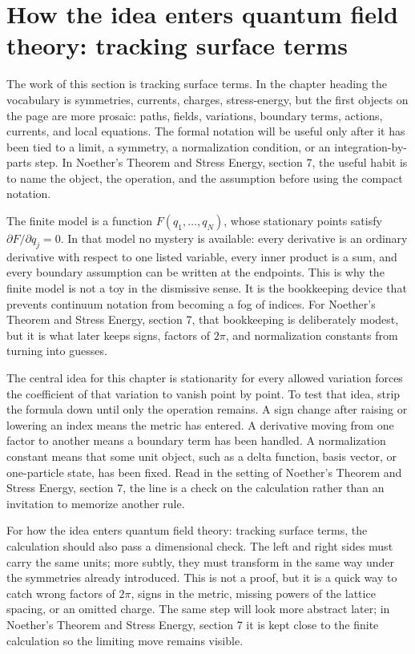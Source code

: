 \section{How the idea enters quantum field theory: tracking surface terms}

The work of this section is tracking surface terms.  In the chapter heading the vocabulary is symmetries, currents, charges, stress-energy, but the first objects on the page are more prosaic: paths, fields, variations, boundary terms, actions, currents, and local equations.  The formal notation will be useful only after it has been tied to a limit, a symmetry, a normalization condition, or an integration-by-parts step.  In Noether's Theorem and Stress Energy, section 7, the useful habit is to name the object, the operation, and the assumption before using the compact notation.

The finite model is a function \(F(q_1,\ldots,q_N)\), whose stationary points satisfy \( \partial F/\partial q_j=0 \).  In that model no mystery is available: every derivative is an ordinary derivative with respect to one listed variable, every inner product is a sum, and every boundary assumption can be written at the endpoints.  This is why the finite model is not a toy in the dismissive sense.  It is the bookkeeping device that prevents continuum notation from becoming a fog of indices.  For Noether's Theorem and Stress Energy, section 7, that bookkeeping is deliberately modest, but it is what later keeps signs, factors of \(2\pi\), and normalization constants from turning into guesses.

The central idea for this chapter is stationarity for every allowed variation forces the coefficient of that variation to vanish point by point.  To test that idea, strip the formula down until only the operation remains.  A sign change after raising or lowering an index means the metric has entered.  A derivative moving from one factor to another means a boundary term has been handled.  A normalization constant means that some unit object, such as a delta function, basis vector, or one-particle state, has been fixed.  Read in the setting of Noether's Theorem and Stress Energy, section 7, the line is a check on the calculation rather than an invitation to memorize another rule.

For how the idea enters quantum field theory: tracking surface terms, the calculation should also pass a dimensional check.  The left and right sides must carry the same units; more subtly, they must transform in the same way under the symmetries already introduced.  This is not a proof, but it is a quick way to catch wrong factors of \(2\pi\), signs in the metric, missing powers of the lattice spacing, or an omitted charge.  The same step will look more abstract later; in Noether's Theorem and Stress Energy, section 7 it is kept close to the finite calculation so the limiting move remains visible.

